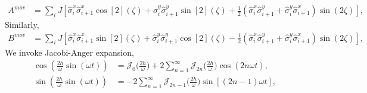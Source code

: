 \documentclass[aps,prb,reprint,showpacs,floatfix,superscriptaddress, onecolumn, nofootinbib, 9pt]{revtex4-2}
\begin{document}
\begin{enumerate}
{	\begin{align}
		A^{mov} &= \sum_{i} J \left[ \hat{\sigma}^x_i \hat{\sigma}^x_{i+1} \cos[2](\zeta) + \hat{\sigma}^y_i \hat{\sigma}^y_{i+1} \sin[2](\zeta)+ \frac12\left(\hat{\sigma}^x_i \hat{\sigma}^y_{i+1} + \hat{\sigma}^y_i \hat{\sigma}^x_{i+1}\right)\sin(2\zeta)\right],
		\label{eq:amov}
	\end{align}
	Similarly,
	\begin{align}
		B^{mov} &= \sum_{i} J \left[ \hat{\sigma}^x_i \hat{\sigma}^x_{i+1} \sin[2](\zeta) + \hat{\sigma}^y_i \hat{\sigma}^y_{i+1} \cos[2](\zeta)- \frac12\left(\hat{\sigma}^x_i \hat{\sigma}^y_{i+1} + \hat{\sigma}^y_i \hat{\sigma}^x_{i+1}\right)\sin(2\zeta)\right],
		\label{eq:bmov}
	\end{align}
	We invoke Jacobi-Anger expansion,
	\begin{align*}
	\cos(\frac{2h}{\omega}\sin(\omega t)) &= \mathcal{J}_0\Big(\frac{2h}{\omega}\Big) + 2 \sum_{n=1}^\infty \mathcal{J}_{2n}\Big(\frac{2h}{\omega}\Big)\cos(2n\omega t),\\
	\sin(\frac{2h}{\omega}\sin(\omega t)) &=-2 \sum_{n=1}^\infty \mathcal{J}_{2n-1}\Big(\frac{2h}{\omega}\Big)\sin[(2n-1)\omega t],
	\end{align*}
	
}
\end{enumerate}
\end{document}
